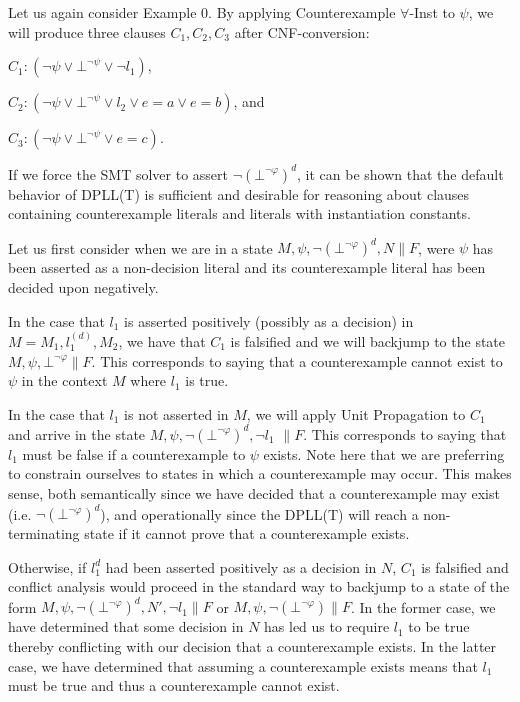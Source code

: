 \documentclass{llncs}
\begin{document}
Let us again consider Example 0.
By applying Counterexample $\forall$-Inst to $\psi$, we will produce three clauses $C_1, C_2, C_3$ after CNF-conversion:

$C_1 : ( \neg \psi \vee \bot^{\neg \psi} \vee \neg l_1)$,

$C_2 : ( \neg \psi \vee \bot^{\neg \psi} \vee l_2 \vee e = a \vee e = b )$, and

$C_3 : ( \neg \psi \vee \bot^{\neg \psi} \vee e = c )$.

If we force the SMT solver to assert $\neg( \bot^{\neg \varphi} )^d$, it can be shown that the default behavior of DPLL(T) is sufficient and desirable for reasoning about clauses containing counterexample literals and literals with instantiation constants.

Let us first consider when we are in a state $M, \psi, \neg( \bot^{\neg \varphi} )^d, N \parallel F$, were $\psi$ has been asserted as a non-decision literal and its counterexample literal has been decided upon negatively.

In the case that $l_1$ is asserted positively (possibly as a decision) in $M = M_1, l^{(d)}_1, M_2$, we have that $C_1$ is falsified and we will backjump to the state $M, \psi, \bot^{\neg \varphi} \parallel F$.
This corresponds to saying that a counterexample cannot exist to $\psi$ in the context $M$ where $l_1$ is true.

In the case that $l_1$ is not asserted in $M$, we will apply Unit Propagation to $C_1$ and arrive in the state $M, \psi, \neg( \bot^{\neg \varphi} )^d, \neg l_1$ $\parallel F$.
This corresponds to saying that $l_1$ must be false if a counterexample to $\psi$ exists.
Note here that we are preferring to constrain ourselves to states in which a counterexample may occur.
This makes sense, both semantically since we have decided that a counterexample may exist (i.e. $\neg( \bot^{\neg \varphi} )^d$), and operationally since the DPLL(T) will reach a non-terminating state if it cannot prove that a counterexample exists.

Otherwise, if $l_1^d$ had been asserted positively as a decision in $N$, $C_1$ is falsified and conflict analysis would proceed in the standard way to backjump to a state of the form $M, \psi, \neg( \bot^{\neg \varphi} )^d, N', \neg l_1 \parallel F$ or $M, \psi, \neg( \bot^{\neg \varphi} )  \parallel F$.
In the former case, we have determined that some decision in $N$ has led us to require $l_1$ to be true thereby conflicting with our decision that a counterexample exists.
In the latter case, we have determined that assuming a counterexample exists means that $l_1$ must be true and thus a counterexample cannot exist.
\end{document}
